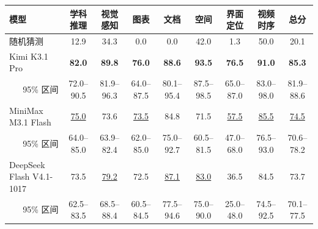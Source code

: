 \begin{tabular}{l*{7}{c}c}
\toprule
模型 & 学科推理 & 视觉感知 & 图表 & 文档 & 空间 & 界面定位 & 视频时序 & \textbf{总分} \\
\midrule
随机猜测 & 12.9 & 34.3 & 0.0 & 0.0 & 42.0 & 1.3 & 50.0 & 20.1 \\
\midrule
Kimi K3.1 Pro & \textbf{82.0} & \textbf{89.8} & \textbf{76.0} & \textbf{88.6} & \textbf{93.5} & \textbf{76.5} & \textbf{91.0} & \textbf{85.3} \\
\multicolumn{1}{r}{\scriptsize\color{gray}95\% 区间} & {\scriptsize\color{gray}72.0--90.5} & {\scriptsize\color{gray}81.9--96.3} & {\scriptsize\color{gray}64.0--87.5} & {\scriptsize\color{gray}80.1--95.4} & {\scriptsize\color{gray}87.5--98.5} & {\scriptsize\color{gray}65.0--87.0} & {\scriptsize\color{gray}83.0--98.0} & {\scriptsize\color{gray}81.9--88.6} \\[2pt]
MiniMax M3.1 Flash & \underline{75.0} & 73.6 & \underline{73.5} & 84.8 & 71.5 & \underline{57.5} & \underline{85.5} & \underline{74.5} \\
\multicolumn{1}{r}{\scriptsize\color{gray}95\% 区间} & {\scriptsize\color{gray}64.0--85.0} & {\scriptsize\color{gray}63.9--82.4} & {\scriptsize\color{gray}62.0--85.0} & {\scriptsize\color{gray}75.0--92.7} & {\scriptsize\color{gray}60.5--81.5} & {\scriptsize\color{gray}47.0--68.0} & {\scriptsize\color{gray}76.5--93.0} & {\scriptsize\color{gray}70.6--78.2} \\[2pt]
DeepSeek Flash V4.1-1017 & 73.5 & \underline{79.2} & 72.5 & \underline{87.1} & \underline{83.0} & 36.5 & 84.5 & 73.7 \\
\multicolumn{1}{r}{\scriptsize\color{gray}95\% 区间} & {\scriptsize\color{gray}62.5--83.5} & {\scriptsize\color{gray}68.5--88.4} & {\scriptsize\color{gray}60.5--84.5} & {\scriptsize\color{gray}77.5--94.6} & {\scriptsize\color{gray}75.0--90.0} & {\scriptsize\color{gray}25.0--48.0} & {\scriptsize\color{gray}74.5--92.5} & {\scriptsize\color{gray}70.1--77.5} \\[2pt]
\bottomrule
\end{tabular}
